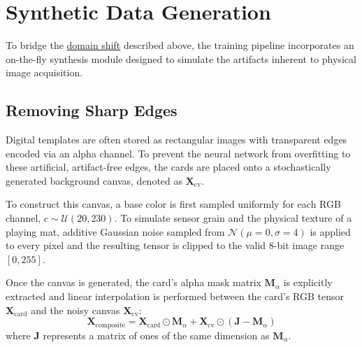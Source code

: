 \section{Synthetic Data Generation}
\label{sec:synthetic_gen}
To bridge the \hyperref[sec:domain_shift]{domain shift} described above, the training pipeline incorporates an on-the-fly synthesis module designed to simulate the artifacts inherent to physical image acquisition.

\subsection{Removing Sharp Edges}\label{sub:sharp_edges}
Digital templates are often stored as rectangular images with transparent edges encoded via an alpha channel. To prevent the neural network from overfitting to these artificial, artifact-free edges, the cards are placed onto a stochastically generated background canvas, denoted as $\mathbf{X}_{\text{cv}}$. 

To construct this canvas, a base color is first sampled uniformly for each RGB channel, $c \sim \mathcal{U}(20, 230)$. To simulate sensor grain and the physical texture of a playing mat, additive Gaussian noise sampled from $\mathcal{N}(\mu=0, \sigma=4)$ is applied to every pixel and the resulting tensor is clipped to the valid 8-bit image range $[0, 255]$.

Once the canvas is generated, the card's alpha mask matrix $\mathbf{M}_\alpha$ is explicitly extracted and linear interpolation is performed between the card's RGB tensor $\mathbf{X}_{\text{card}}$ and the noisy canvas $\mathbf{X}_{\text{cv}}$:
\begin{equation}
    \mathbf{X}_{\text{composite}} = \mathbf{X}_{\text{card}} \odot \mathbf{M}_\alpha + \mathbf{X}_{\text{cv}} \odot \left(\mathbf{J} - \mathbf{M}_\alpha\right)
\end{equation}
where $\mathbf{J}$ represents a matrix of ones of the same dimension as $\mathbf{M}_\alpha$.

